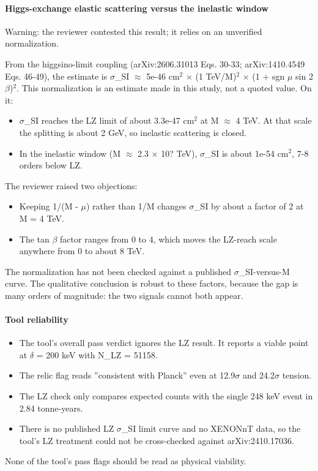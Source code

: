 \documentclass[11pt,a4paper]{article}
\begin{document}
\paragraph{Higgs-exchange elastic scattering versus the inelastic window}
Warning: the reviewer contested this result; it relies on an unverified normalization.

From the higgsino-limit coupling (arXiv:2606.31013 Eqs. 30-33; arXiv:1410.4549 Eqs. 46-49), the estimate is $\sigma$\_SI $\approx$ 5e-46 cm$^2$ $\times$ (1 TeV/M)$^2$ $\times$ (1 + sgn $\mu$ sin 2$\beta$)$^2$. This normalization is an estimate made in this study, not a quoted value. On it:

\begin{itemize}
  \item $\sigma$\_SI reaches the LZ limit of about 3.3e-47 cm$^2$ at M $\approx$ 4 TeV. At that scale the splitting is about 2 GeV, so inelastic scattering is closed.
  \item In the inelastic window (M $\approx$ 2.3 $\times$ 10? TeV), $\sigma$\_SI is about 1e-54 cm$^2$, 7-8 orders below LZ.
\end{itemize}
The reviewer raised two objections:

\begin{itemize}
  \item Keeping 1/(M - \textbar{}$\mu$\textbar{}) rather than 1/M changes $\sigma$\_SI by about a factor of 2 at M = 4 TeV.
  \item The tan $\beta$ factor ranges from 0 to 4, which moves the LZ-reach scale anywhere from 0 to about 8 TeV.
\end{itemize}
The normalization has not been checked against a published $\sigma$\_SI-versus-M curve. The qualitative conclusion is robust to these factors, because the gap is many orders of magnitude: the two signals cannot both appear.

\paragraph{Tool reliability}
\begin{itemize}
  \item The tool's overall pass verdict ignores the LZ result. It reports a viable point at $\delta$ = 200 keV with N\_LZ = 51158.
  \item The relic flag reads ''consistent with Planck'' even at 12.9$\sigma$ and 24.2$\sigma$ tension.
  \item The LZ check only compares expected counts with the single 248 keV event in 2.84 tonne-years.
  \item There is no published LZ $\sigma$\_SI limit curve and no XENONnT data, so the tool's LZ treatment could not be cross-checked against arXiv:2410.17036.
\end{itemize}
None of the tool's pass flags should be read as physical viability.
\end{document}
